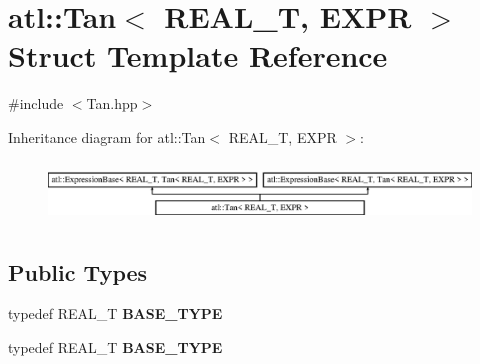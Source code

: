 \hypertarget{structatl_1_1_tan}{\section{atl\+:\+:Tan$<$ R\+E\+A\+L\+\_\+\+T, E\+X\+P\+R $>$ Struct Template Reference}
\label{structatl_1_1_tan}
}


{\ttfamily \#include $<$Tan.\+hpp$>$}

Inheritance diagram for atl\+:\+:Tan$<$ R\+E\+A\+L\+\_\+\+T, E\+X\+P\+R $>$\+:\begin{figure}[H]
\begin{center}
\leavevmode
\includegraphics[height=1.642229cm]{structatl_1_1_tan}
\end{center}
\end{figure}
\subsection*{Public Types}
\begin{DoxyCompactItemize}
\item 
\hypertarget{structatl_1_1_tan_aaafd5cb21795f2c493a239df32a10fe9}{typedef R\+E\+A\+L\+\_\+\+T {\bfseries B\+A\+S\+E\+\_\+\+T\+Y\+P\+E}}\label{structatl_1_1_tan_aaafd5cb21795f2c493a239df32a10fe9}

\item 
\hypertarget{structatl_1_1_tan_aaafd5cb21795f2c493a239df32a10fe9}{typedef R\+E\+A\+L\+\_\+\+T {\bfseries B\+A\+S\+E\+\_\+\+T\+Y\+P\+E}}\label{structatl_1_1_tan_aaafd5cb21795f2c493a239df32a10fe9}

\end{DoxyCompactItemize}
